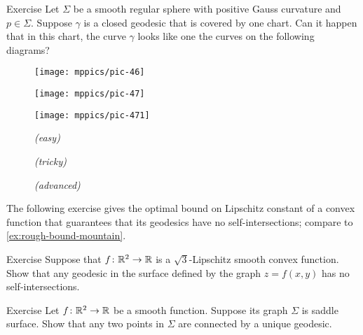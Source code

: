 \begin{thm}{Exercise}\label{ex:self-intersections}
Let $\Sigma$ be a smooth regular sphere with positive Gauss curvature and $p\in\Sigma$. 
Suppose $\gamma$ is a closed geodesic that is covered by one chart.
Can it happen that in this chart, the curve $\gamma$ looks like one the curves on the following diagrams?

\begin{figure}[h]
\begin{minipage}{.32\textwidth}
\centering
\texttt{[image: mppics/pic-46]}
\end{minipage}
\hfill
\begin{minipage}{.32\textwidth}
\centering
\texttt{[image: mppics/pic-47]}
\end{minipage}
\hfill
\begin{minipage}{.32\textwidth}
\centering
\texttt{[image: mppics/pic-471]}
\end{minipage}


\medskip

\begin{minipage}{.32\textwidth}
\centering
\caption*{\textit{(easy)}}
\end{minipage}\hfill
\begin{minipage}{.32\textwidth}
\centering
\caption*{\textit{(tricky)}}
\end{minipage}
\hfill
\begin{minipage}{.32\textwidth}
\centering
\caption*{\textit{(advanced)}}
\end{minipage}
\vskip-4mm
\end{figure}

\end{thm}

The following exercise gives the optimal bound on Lipschitz constant of a convex function that guarantees that its geodesics have no self-intersections;
compare to \ref{ex:rough-bound-mountain}.

\begin{thm}{Exercise}\label{ex:sqrt(3)}
Suppose that $f\colon\mathbb{R}^2\to\mathbb{R}$ is a $\sqrt{3}$-Lipschitz smooth convex function.
Show that any geodesic in the surface defined by the graph $z=f(x,y)$ has no self-intersections.
\end{thm}

\begin{thm}{Exercise}\label{ex:unique-geod}
Let $f\colon\mathbb{R}^2\to\mathbb{R}$ be a smooth function.
Suppose its graph $\Sigma$ is saddle surface.
Show that any two points in $\Sigma$ are connected by a unique geodesic.
\end{thm}

